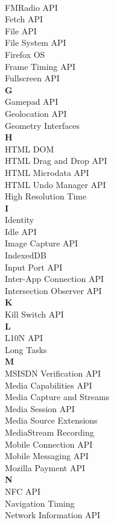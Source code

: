 \begin{multicols}{4}
\\ FMRadio API
\\ Fetch API 
\\ File API
\\ File System API 
\\ Firefox OS
\\ Frame Timing API
\\ Fullscreen API
\\ \textbf{G}
\\ Gamepad API 
\\ Geolocation API
\\ Geometry Interfaces
\\ \textbf{H}
\\ HTML DOM
\\ HTML Drag and Drop API
\\ HTML Microdata API
\\ HTML Undo Manager API
\\ High Resolution Time
\\ \textbf{I}
\\ Identity
\\ Idle API
\\ Image Capture API
\\ IndexedDB
\\ Input Port API
\\ Inter-App Connection API
\\ Intersection Observer API
\\ \textbf{K}
\\ Kill Switch API
\\ \textbf{L}
\\ L10N API
\\ Long Tasks
\\ \textbf{M}
\\ MSISDN Verification API
\\ Media Capabilities API 
\\ Media Capture and Streams
\\ Media Session API
\\ Media Source Extensions
\\ MediaStream Recording
\\ Mobile Connection API
\\ Mobile Messaging API
\\ Mozilla Payment API
\\ \textbf{N}
\\ NFC API
\\ Navigation Timing
\\ Network Information API 

\end{multicols}
